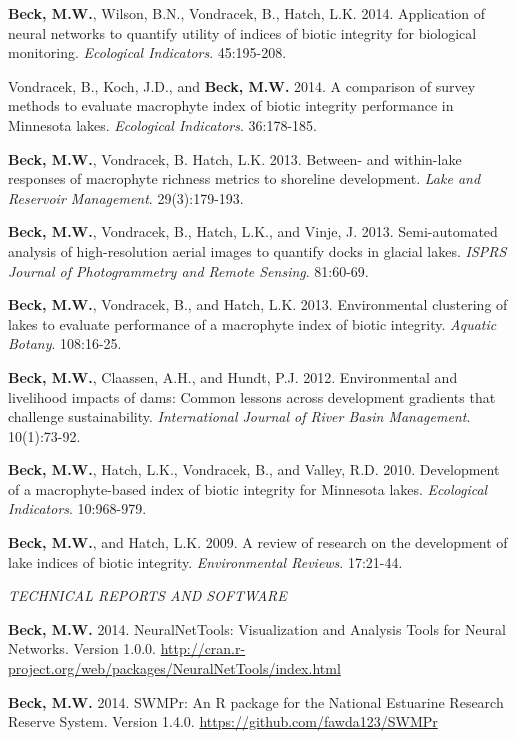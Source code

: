 \documentclass[letterpaper,12pt]{article}
\begin{document}
\textbf{Beck, M.W.}, Wilson, B.N., Vondracek, B., Hatch, L.K. 2014. Application of neural networks to quantify utility of indices of biotic integrity for biological monitoring. \textit{Ecological Indicators}. 45:195-208.

Vondracek, B., Koch, J.D., and \textbf{Beck, M.W.} 2014. A comparison of survey methods to evaluate macrophyte index of biotic integrity performance in Minnesota lakes. \textit{Ecological Indicators}. 36:178-185.

\textbf{Beck, M.W.}, Vondracek, B. Hatch, L.K. 2013. Between- and within-lake responses of macrophyte richness metrics to shoreline development. \textit{Lake and Reservoir Management}. 29(3):179-193.

\textbf{Beck, M.W.}, Vondracek, B., Hatch, L.K., and Vinje, J. 2013. Semi-automated analysis of high-resolution aerial images to quantify docks in glacial lakes. \textit{ISPRS Journal of Photogrammetry and Remote Sensing}. 81:60-69.

\textbf{Beck, M.W.}, Vondracek, B., and Hatch, L.K. 2013. Environmental clustering of lakes to evaluate performance of a macrophyte index of biotic integrity. \textit{Aquatic Botany}. 108:16-25.

\textbf{Beck, M.W.}, Claassen, A.H., and Hundt, P.J. 2012. Environmental and livelihood impacts of dams: Common lessons across development gradients that challenge sustainability. \textit{International Journal of River Basin Management}. 10(1):73-92.

\textbf{Beck, M.W.}, Hatch, L.K., Vondracek, B., and Valley, R.D. 2010. Development of a macrophyte-based index of biotic integrity for Minnesota lakes. \textit{Ecological Indicators}. 10:968-979.

\textbf{Beck, M.W.}, and Hatch, L.K. 2009. A review of research on the development of lake indices of biotic integrity. \textit{Environmental Reviews}. 17:21-44.

\vspace{\baselineskip} 
\centerline{\large{\textit{TECHNICAL REPORTS AND SOFTWARE}}}

\textbf{Beck, M.W.} 2014. NeuralNetTools: Visualization and Analysis Tools for Neural Networks. Version 1.0.0. \href{http://cran.r-project.org/web/packages/NeuralNetTools/index.html}{http://cran.r-project.org/web/packages/NeuralNetTools/index.html}

\textbf{Beck, M.W.} 2014. SWMPr: An R package for the National Estuarine Research Reserve System. Version 1.4.0. \href{https://github.com/fawda123/SWMPr}{https://github.com/fawda123/SWMPr}
\end{document}

